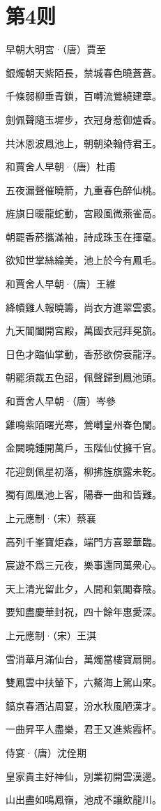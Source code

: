 \documentclass[12pt,a4paper]{ctexbook}
\begin{document}
\section{第4则}
早朝大明宮·（唐）賈至\par
銀燭朝天紫陌長，禁城春色曉蒼蒼。\par
千條弱柳垂青鎖，百囀流鶯繞建章。\par
劍佩聲隨玉墀步，衣冠身惹御爐香。\par
共沐恩波鳳池上，朝朝染翰侍君王。\par
和賈舍人早朝·（唐）杜甫\par
五夜漏聲催曉箭，九重春色醉仙桃。\par
旌旗日暖龍蛇動，宮殿風微燕雀高。\par
朝罷香菸攜滿袖，詩成珠玉在揮毫。\par
欲知世掌絲綸美，池上於今有鳳毛。\par
和賈舍人早朝·（唐）王維\par
絳幘雞人報曉籌，尚衣方進翠雲裘。\par
九天閶闔開宮殿，萬國衣冠拜冕旒。\par
日色才臨仙掌動，香菸欲傍袞龍浮。\par
朝罷須裁五色詔，佩聲歸到鳳池頭。\par
和賈舍人早朝·（唐）岑參\par
雞鳴紫陌曙光寒，鶯囀皇州春色闌。\par
金闕曉鍾開萬戶，玉階仙仗擁千官。\par
花迎劍佩星初落，柳拂旌旗露未乾。\par
獨有鳳凰池上客，陽春一曲和皆難。\par
上元應制·（宋）蔡襄\par
高列千峯寶炬森，端門方喜翠華臨。\par
宸遊不爲三元夜，樂事還同萬衆心。\par
天上清光留此夕，人間和氣閣春陰。\par
要知盡慶華封祝，四十餘年惠愛深。\par
上元應制·（宋）王淇\par
雪消華月滿仙台，萬燭當樓寶扇開。\par
雙鳳雲中扶輦下，六鰲海上駕山來。\par
鎬京春酒沾周宴，汾水秋風陋漢才。\par
一曲昇平人盡樂，君王又進紫霞杯。\par
侍宴·（唐）沈佺期\par
皇家貴主好神仙，別業初開雲漢邊。\par
山出盡如鳴鳳嶺，池成不讓飲龍川。\par
\end{document}
